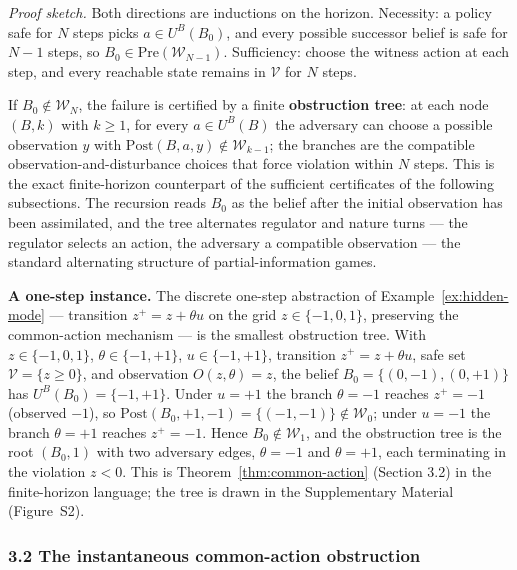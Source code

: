 \documentclass[10pt,twocolumn]{article}
\theoremstyle{definition}
\begin{document}
\emph{Proof sketch.} Both directions are inductions on the horizon. Necessity: a policy safe for \(N\) steps picks \(a \in U^B(B_0)\), and every possible successor belief is safe for \(N - 1\) steps, so \(B_0 \in \mathrm{Pre}(\mathcal{W}_{N-1})\). Sufficiency: choose the witness action at each step, and every reachable state remains in \(\mathcal{V}\) for \(N\) steps.

If \(B_0\notin\mathcal W_N\), the failure is certified by a finite
\textbf{obstruction tree}: at each node \((B,k)\) with \(k\ge1\), for
every \(a\in U^B(B)\) the adversary can choose a possible observation
\(y\) with \(\mathrm{Post}(B,a,y)\notin\mathcal W_{k-1}\); the branches
are the compatible observation-and-disturbance choices that force
violation within \(N\) steps. This is the exact finite-horizon
counterpart of the sufficient certificates of the following subsections. The recursion reads \(B_0\) as the belief after the
initial observation has been assimilated, and the tree alternates
regulator and nature turns --- the regulator selects an action, the
adversary a compatible observation --- the standard alternating
structure of partial-information games.

\textbf{A one-step instance.} The discrete one-step abstraction of
Example~\ref{ex:hidden-mode} --- transition \(z^+ = z + \theta u\) on
the grid \(z \in \{-1,0,1\}\), preserving the common-action mechanism
--- is the smallest obstruction tree. With
\(z\in\{-1,0,1\}\), \(\theta\in\{-1,+1\}\), \(u\in\{-1,+1\}\),
transition \(z^+=z+\theta u\), safe set \(\mathcal V=\{z\ge 0\}\), and
observation \(O(z,\theta)=z\), the belief \(B_0=\{(0,-1),(0,+1)\}\) has
\(U^B(B_0)=\{-1,+1\}\). Under \(u=+1\) the branch \(\theta=-1\) reaches
\(z^+=-1\) (observed \(-1\)), so
\(\mathrm{Post}(B_0,+1,-1)=\{(-1,-1)\}\notin\mathcal W_0\); under
\(u=-1\) the branch \(\theta=+1\) reaches \(z^+=-1\). Hence
\(B_0\notin\mathcal W_1\), and the obstruction tree is the root
\((B_0,1)\) with two adversary edges, \(\theta=-1\) and \(\theta=+1\),
each terminating in the violation \(z<0\). This is
Theorem~\ref{thm:common-action} (Section 3.2) in the finite-horizon language; the tree is drawn in the Supplementary Material (Figure~S2).





\subsubsection{3.2 The instantaneous common-action
obstruction}\label{the-instantaneous-common-action-obstruction}
\end{document}

